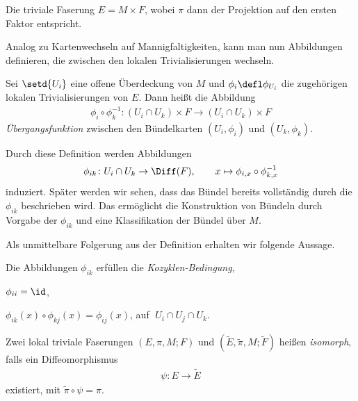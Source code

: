 \documentclass[%
	paper=a5,%
	fleqn,%
	DIV=18,%
	BCOR=0mm,
	fontsize=11pt,
	titlepage=false,%
	bibliography=totoc,
	DIV=18,%
	twoside=true,
	pdftitle=Riemannsche Geometrie,
	pdfauthor=Uwe Semmelmann,
	numbers=noendperiod]%
	{scrbook}
\begin{document}
\begin{ex}
Die triviale Faserung $E= M\times F$, wobei $\pi$ dann der Projektion auf den
ersten Faktor entspricht.\boxc
\end{ex}

Analog zu Kartenwechseln auf Mannigfaltigkeiten, kann man nun
Abbildungen definieren, die zwischen den lokalen Trivialisierungen wechseln.

\begin{defn}
Sei $\setd{U_i}$ eine offene Überdeckung von $M$ und $\phi_i\defl \phi_{U_i}$
die zugehörigen lokalen Trivialisierungen von $E$. Dann heißt die Abbildung
\begin{align*}
\phi_i\circ\phi_k^{-1} \colon (U_i\cap U_k)\times F\to (U_i\cap U_k)\times F
\end{align*}
\emph{Übergangsfunktion} zwischen den Bündelkarten $(U_i,\phi_i)$ und
$(U_k,\phi_k)$.\fish
\end{defn}


Durch diese Definition werden Abbildungen
\begin{align*}
\phi_{ik}\colon U_i\cap U_k\to \Diff(F),\qquad x\mapsto
\phi_{i,x}\circ\phi_{k,x}^{-1}
\end{align*}
induziert. Später werden wir sehen, dass das Bündel bereits vollständig durch
die $\phi_{ik}$ beschrieben wird. Das ermöglicht die Konstruktion von Bündeln
durch Vorgabe der $\phi_{ik}$ und eine Klassifikation der Bündel über $M$.

Als unmittelbare Folgerung aus der Definition erhalten wir folgende Aussage.

\begin{lem}
Die Abbildungen $\phi_{ik}$ erfüllen die \emph{Kozyklen-Bedingung},
\begin{propenum}
\item $\phi_{ii} = \id$,
\item $\phi_{ik}(x)\circ\phi_{kj}(x) = \phi_{ij}(x)$,\qquad
auf $ \;U_i\cap U_j\cap U_k$.\fish
\end{propenum}
\end{lem}


\begin{defn}
Zwei lokal triviale Faserungen $(E,\pi,M;F)$ und
$(\tilde{E},\tilde{\pi},M;\tilde{F})$ heißen \emph{isomorph}, falls ein
Diffeomorphismus
\begin{align*}
\psi\colon E\to \tilde{E}
\end{align*}
existiert, mit $\tilde{\pi}\circ\psi = \pi$.\fish
\end{defn}
\end{document}

